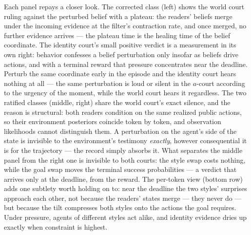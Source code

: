 \documentclass[11pt]{article}
\begin{document}
Each panel repays a closer look. The corrected class (left) shows the world court ruling against the perturbed belief with a plateau: the readers' beliefs merge under the incoming evidence at the filter's contraction rate, and once merged, no further evidence arrives --- the plateau time is the healing time of the belief coordinate. The identity court's small positive verdict is a measurement in its own right: behavior confesses a belief perturbation only insofar as beliefs drive actions, and with a terminal reward that pressure concentrates near the deadline. Perturb the same coordinate early in the episode and the identity court hears nothing at all --- the same perturbation is loud or silent in the $a$-court according to the urgency of the moment, while the world court hears it regardless. The two ratified classes (middle, right) share the world court's exact silence, and the reason is structural: both readers condition on the same realized public actions, so their environment posteriors coincide token by token, and observation likelihoods cannot distinguish them. A perturbation on the agent's side of the state is invisible to the environment's testimony \emph{exactly}, however consequential it is for the trajectory --- the record simply absorbs it. What separates the middle panel from the right one is invisible to both courts: the style swap costs nothing, while the goal swap moves the terminal success probabilities --- a verdict that arrives only at the deadline, from the reward. The per-token view (bottom row) adds one subtlety worth holding on to: near the deadline the two styles' surprises approach each other, not because the readers' states merge --- they never do --- but because the tilt compresses both styles onto the actions the goal requires. Under pressure, agents of different styles act alike, and identity evidence dries up exactly when constraint is highest.
\end{document}
